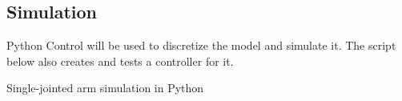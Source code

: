 \subsection{Simulation}

Python Control will be used to discretize the model and simulate it. The script
below also creates and tests a controller for it.

\begin{snippet}
  \caption{Single-jointed arm simulation in Python}
  \label{lst:single_jointed_arm_sim}
\end{snippet}

